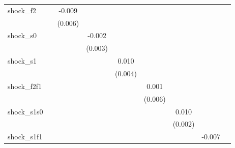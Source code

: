 {\begin{tabular}{l*{8}{c}}
\addlinespace
shock\_f2    &                     &      -0.009         &                     &                     &                     &                     &                     &                     \\
            &                     &     (0.006)         &                     &                     &                     &                     &                     &                     \\
\addlinespace
shock\_s0    &                     &                     &      -0.002         &                     &                     &                     &                     &                     \\
            &                     &                     &     (0.003)         &                     &                     &                     &                     &                     \\
\addlinespace
shock\_s1    &                     &                     &                     &       0.010\sym{**} &                     &                     &                     &                     \\
            &                     &                     &                     &     (0.004)         &                     &                     &                     &                     \\
\addlinespace
shock\_f2f1  &                     &                     &                     &                     &       0.001         &                     &                     &                     \\
            &                     &                     &                     &                     &     (0.006)         &                     &                     &                     \\
\addlinespace
shock\_s1s0  &                     &                     &                     &                     &                     &       0.010\sym{***}&                     &                     \\
            &                     &                     &                     &                     &                     &     (0.002)         &                     &                     \\
\addlinespace
shock\_s1f1  &                     &                     &                     &                     &                     &                     &      -0.007         &                     \\

\end{tabular}}
